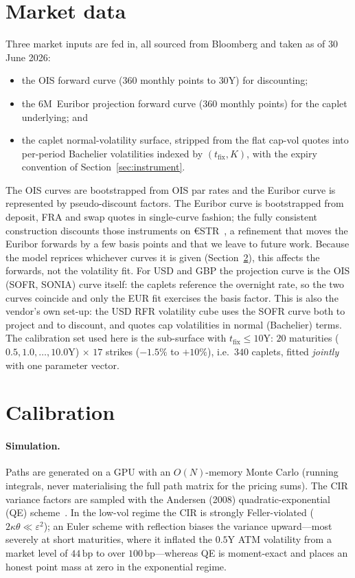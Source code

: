 \documentclass[11pt]{article}
\newcommand{\bp}{\,\text{bp}}
\begin{document}
\section{Market data}
Three market inputs are fed in, all sourced from Bloomberg and taken as of 30 June 2026:
\begin{itemize}
  \item the OIS forward curve (\(360\) monthly points to \(30\)Y) for discounting;
  \item the 6M~Euribor projection forward curve (\(360\) monthly points) for the caplet underlying; and
  \item the caplet normal-volatility surface, stripped from the flat cap-vol quotes into
  per-period Bachelier volatilities indexed by \((t_{\text{fix}},K)\), with the expiry
  convention of Section~\ref{sec:instrument}.
\end{itemize}
The OIS curves are bootstrapped from OIS par rates and the Euribor curve is represented by
pseudo-discount factors. The Euribor curve is bootstrapped
from deposit, FRA and swap quotes in single-curve fashion; the fully consistent construction
discounts those instruments on €STR~\cite[Sec.~4.9]{henrard2026}, a refinement that
moves the Euribor forwards by a few basis points and that we leave to future work. Because the model
reprices whichever curves it is given (Section~\ref{sec:calib}), this affects the forwards, not the
volatility fit. For USD and GBP the projection curve is the OIS (SOFR, SONIA) curve itself: the
caplets reference the overnight rate, so the two curves coincide and only the EUR fit exercises the
basis factor. This
is also the vendor's own set-up: the USD RFR volatility cube uses the SOFR curve both to project
and to discount, and quotes cap volatilities in normal (Bachelier) terms.
The calibration set used here is the sub-surface with \(t_{\text{fix}}\le 10\)Y: \(20\) maturities
(\(0.5,1.0,\dots,10.0\)Y) \(\times\) \(17\) strikes (\(-1.5\%\) to \(+10\%\)), i.e.\ \(340\)
caplets, fitted \emph{jointly} with one parameter vector.

\section{Calibration}
\label{sec:calib}
\paragraph{Simulation.} Paths are generated on a GPU with an \(O(N)\)-memory Monte Carlo (running
integrals, never materialising the full path matrix for the pricing sums). The CIR variance
factors are sampled with the Andersen (2008) quadratic-exponential (QE)
scheme~\cite{andersen2008,broadie2006}. In the low-vol
regime the CIR is strongly Feller-violated (\(2\kappa\theta\ll\varepsilon^2\)); an Euler scheme
with reflection biases the variance upward---most severely at short maturities, where it inflated
the \(0.5\)Y ATM volatility from a market level of \(44\bp\) to over \(100\bp\)---whereas QE is
moment-exact and places an honest point mass at zero in the exponential regime.
\end{document}
